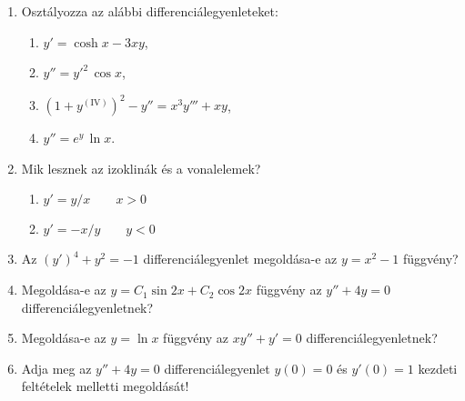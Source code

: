 \documentclass{szb-practice}
\begin{document}
\begin{enumerate}
  \item Osztályozza az alábbi differenciálegyenleteket:
        \begin{multicols}{2}
          \begin{enumerate}
            \item $y' = \cosh x - 3xy$,
            \item $y'' = y'^2 \, \cos x$,
            \item $\left( 1 + y^{(\mathrm{IV})} \right)^2 - y'' = x^3 y''' + xy$,
            \item $y'' = e^y \, \ln x$.
          \end{enumerate}
        \end{multicols}




  \item Mik lesznek az izoklinák és a vonalelemek?
        \begin{enumerate}
          \item $y' = y / x \qquad x > 0$
          \item $y' = -x / y \qquad y < 0$
        \end{enumerate}

  \item Az $(y')^4 + y^2 = -1$ differenciálegyenlet megoldása-e az
        $y = x^2 - 1$ függvény?

  \item Megoldása-e az $y = C_1 \sin 2x + C_2 \cos 2x$ függvény az
        $y'' + 4y = 0$ differenciálegyenletnek?

  \item Megoldása-e az $y = \ln x$ függvény az $xy'' + y' = 0$
        differenciálegyenletnek?

  \item Adja meg az $y'' + 4y = 0$ differenciálegyenlet $y(0) = 0$ és
        $y'(0) = 1$ kezdeti feltételek melletti megoldását!


\end{enumerate}
\end{document}
